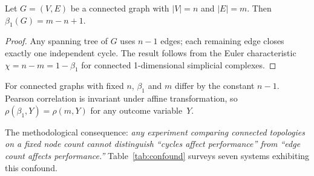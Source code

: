 \documentclass{llncs}
\begin{document}
\begin{theorem}
\label{thm:confound}
Let $G = (V, E)$ be a connected graph with $|V| = n$ and $|E| = m$. Then
$\beta_1(G) = m - n + 1$.
\end{theorem}

\begin{proof}
Any spanning tree of $G$ uses $n - 1$ edges; each remaining edge closes exactly
one independent cycle. The result follows from the Euler characteristic
$\chi = n - m = 1 - \beta_1$ for connected 1-dimensional simplicial complexes.
\end{proof}

\begin{corollary}
\label{cor:pearson}
For connected graphs with fixed $n$, $\beta_1$ and $m$ differ by the constant
$n - 1$. Pearson correlation is invariant under affine transformation, so
$\rho(\beta_1, Y) = \rho(m, Y)$ for any outcome variable~$Y$.
\end{corollary}

The methodological consequence: \emph{any experiment comparing connected
topologies on a fixed node count cannot distinguish ``cycles affect
performance'' from ``edge count affects performance.''}
Table~\ref{tab:confound} surveys seven systems exhibiting this confound.

\begin{table}[t]
\centering
\caption{Systems enforcing the DAG constraint. All vary $\beta_1$ and density simultaneously.}
\label{tab:confound}
\small
{}
\end{table}
\end{document}

